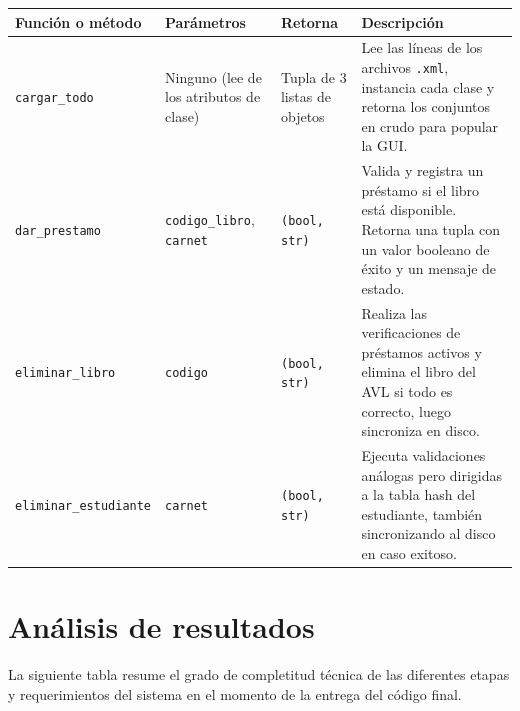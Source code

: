 \documentclass[11pt]{article}
\begin{document}
\begin{longtable}{p{} p{} p{} p{}}
\toprule
\textbf{Función o método} & \textbf{Parámetros} & \textbf{Retorna} & \textbf{Descripción} \\
\midrule
\texttt{cargar\_todo} & Ninguno (lee de los atributos de clase) & Tupla de 3 listas de objetos & Lee las líneas de los archivos \texttt{.xml}, instancia cada clase y retorna los conjuntos en crudo para popular la GUI. \\
\texttt{dar\_prestamo} & \texttt{codigo\_libro}, \texttt{carnet} & \texttt{(bool, str)} & Valida y registra un préstamo si el libro está disponible. Retorna una tupla con un valor booleano de éxito y un mensaje de estado. \\
\texttt{eliminar\_libro} & \texttt{codigo} & \texttt{(bool, str)} & Realiza las verificaciones de préstamos activos y elimina el libro del AVL si todo es correcto, luego sincroniza en disco. \\
\texttt{eliminar\_estudiante}& \texttt{carnet} & \texttt{(bool, str)} & Ejecuta validaciones análogas pero dirigidas a la tabla hash del estudiante, también sincronizando al disco en caso exitoso. \\
\bottomrule
\end{longtable}

\section{Análisis de resultados}

La siguiente tabla resume el grado de completitud técnica de las diferentes etapas y requerimientos del sistema en el momento de la entrega del código final.
\end{document}
